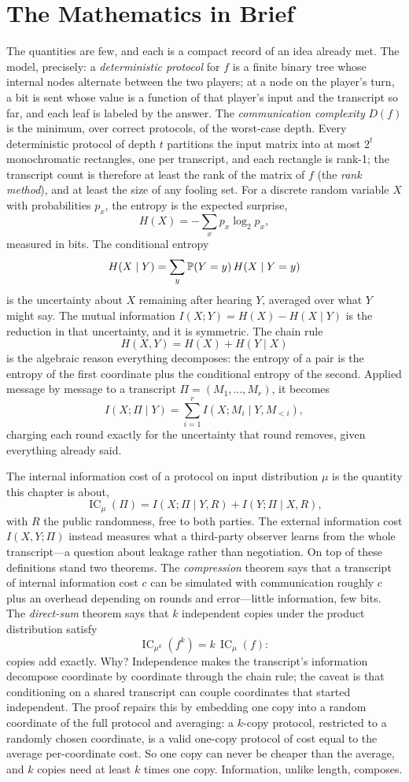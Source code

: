 \section{The Mathematics in Brief}
The quantities are few, and each is a compact record of an idea already met. The model, precisely: a \emph{deterministic protocol} for $f$ is a finite binary tree whose internal nodes alternate between the two players; at a node on the player's turn, a bit is sent whose value is a function of that player's input and the transcript so far, and each leaf is labeled by the answer. The \emph{communication complexity} $D(f)$ is the minimum, over correct protocols, of the worst-case depth. Every deterministic protocol of depth $t$ partitions the input matrix into at most $2^t$ monochromatic rectangles, one per transcript, and each rectangle is rank-1; the transcript count is therefore at least the rank of the matrix of $f$ (the \emph{rank method}), and at least the size of any fooling set. For a discrete random variable $X$ with probabilities $p_x$, the entropy is the expected surprise,
\[
H(X)=-\sum_x p_x\log_2 p_x,
\]
measured in bits. The conditional entropy
\[
H(X\mid Y)=\sum_y \mathbb{P}(Y=y)\,H(X\mid Y=y)
\]
is the uncertainty about $X$ remaining after hearing $Y$, averaged over what $Y$ might say. The mutual information $I(X;Y)=H(X)-H(X\mid Y)$ is the reduction in that uncertainty, and it is symmetric. The chain rule
\[
H(X,Y)=H(X)+H(Y\mid X)
\]
is the algebraic reason everything decomposes: the entropy of a pair is the entropy of the first coordinate plus the conditional entropy of the second. Applied message by message to a transcript $\Pi=(M_1,\dots,M_r)$, it becomes
\[
I(X;\Pi\mid Y)=\sum_{i=1}^r I(X;M_i\mid Y,M_{<i}),
\]
charging each round exactly for the uncertainty that round removes, given everything already said.

The internal information cost of a protocol on input distribution $\mu$ is the quantity this chapter is about,
\[
\operatorname{IC}_\mu(\Pi)=I(X;\Pi\mid Y,R)+I(Y;\Pi\mid X,R),
\]
with $R$ the public randomness, free to both parties. The external information cost $I(X,Y;\Pi)$ instead measures what a third-party observer learns from the whole transcript---a question about leakage rather than negotiation. On top of these definitions stand two theorems. The \emph{compression} theorem says that a transcript of internal information cost $c$ can be simulated with communication roughly $c$ plus an overhead depending on rounds and error---little information, few bits. The \emph{direct-sum} theorem says that $k$ independent copies under the product distribution satisfy
\[
\operatorname{IC}_{\mu^k}(f^k)=k\,\operatorname{IC}_\mu(f):
\]
copies add exactly. Why? Independence makes the transcript's information decompose coordinate by coordinate through the chain rule; the caveat is that conditioning on a shared transcript can couple coordinates that started independent. The proof repairs this by embedding one copy into a random coordinate of the full protocol and averaging: a $k$-copy protocol, restricted to a randomly chosen coordinate, is a valid one-copy protocol of cost equal to the average per-coordinate cost. So one copy can never be cheaper than the average, and $k$ copies need at least $k$ times one copy. Information, unlike length, composes.

